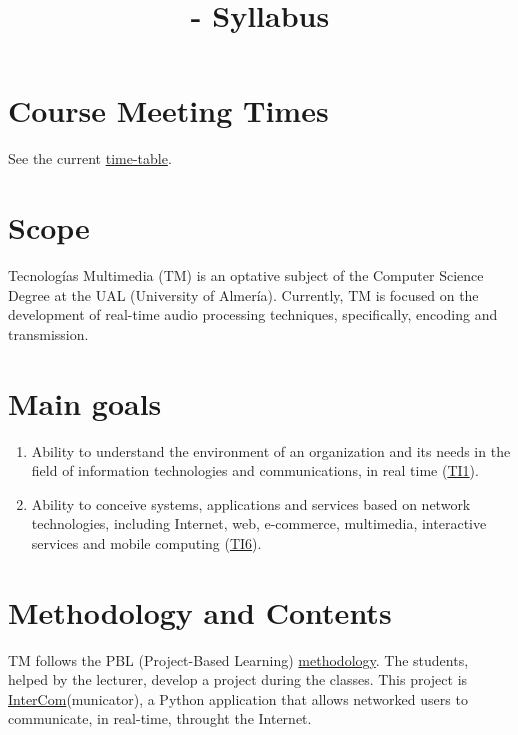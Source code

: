 

\title{\TM{} - Syllabus}

\maketitle

\section{Course Meeting Times}

See the current \href{https://www.ual.es/estudios/grados/presentacion/plandeestudios/asignatura/4015/40154321}{time-table}.

\section{Scope}

Tecnologías Multimedia (TM) is an optative subject of the Computer
Science Degree at the UAL (University of Almería). Currently, TM is
focused on the development of real-time audio processing techniques,
specifically, encoding and transmission.

\section{Main goals}

\begin{enumerate}
\item Ability to understand the environment of an organization and its
  needs in the field of information technologies and communications,
  in real time
  (\href{https://www.ual.es/application/files/8516/5061/5446/memoriavig-ing-informatica-4015.pdf}{TI1}).
\item Ability to conceive systems, applications and services based on
  network technologies, including Internet, web, e-commerce,
  multimedia, interactive services and mobile computing
  (\href{https://www.ual.es/application/files/8516/5061/5446/memoriavig-ing-informatica-4015.pdf}{TI6}).
\end{enumerate}

\section{Methodology and Contents}
TM follows the PBL (Project-Based Learning)
\href{http://portafirma.ual.es/pfirma/downloadReport/file?idDocument=4u61Ie5es2&idRequest=ZeBY35LlFa}{methodology}. The
students, helped by the lecturer, develop a project during the
classes. This project is
\href{https://github.com/Tecnologias-multimedia/intercom}{InterCom}(municator),
a Python application that allows networked users to communicate, in
real-time, throught the Internet.

